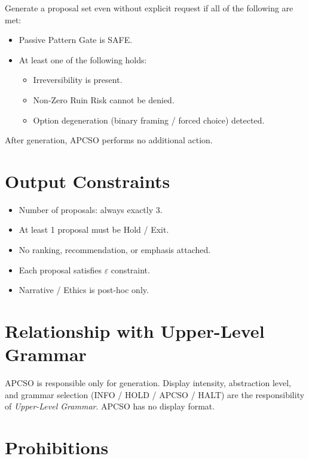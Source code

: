 Generate a proposal set even without explicit request if all of the
following are met:

\begin{itemize}
\item Passive Pattern Gate is SAFE.
\item At least one of the following holds:
\begin{itemize}
\item Irreversibility is present.
\item Non-Zero Ruin Risk cannot be denied.
\item Option degeneration (binary framing / forced choice)
detected.
\end{itemize}
\end{itemize}

\noindent
After generation, APCSO performs no additional action.

\section{Output Constraints}
\label{sec:parallel-ooda-output}

\begin{itemize}
\item Number of proposals: always exactly 3.
\item At least 1 proposal must be Hold / Exit.
\item No ranking, recommendation, or emphasis attached.
\item Each proposal satisfies $\varepsilon$ constraint.
\item Narrative / Ethics is post-hoc only.
\end{itemize}

\section{Relationship with Upper-Level Grammar}
\label{sec:parallel-ooda-grammar}

APCSO is responsible only for generation. Display intensity,
abstraction level, and grammar selection
(INFO / HOLD / APCSO / HALT) are the responsibility of
\emph{Upper-Level Grammar}. APCSO has no display format.

\section{Prohibitions}
\label{sec:parallel-ooda-prohibitions}

